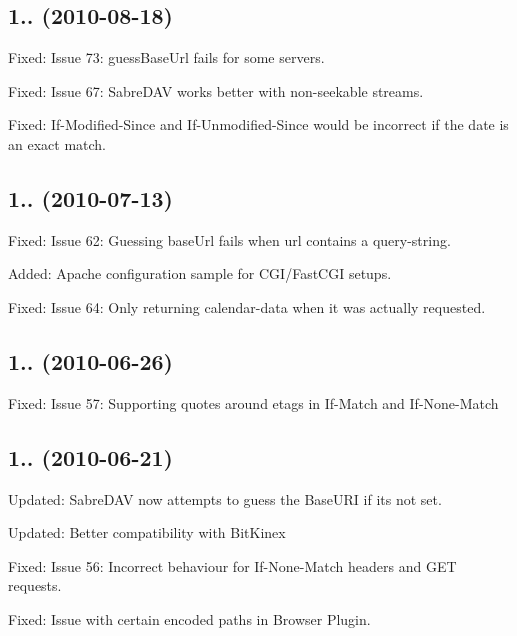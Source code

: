 \subsection*{1.. (2010-\/08-\/18) }


\begin{DoxyItemize}
\item Fixed\+: Issue 73\+: guess\+Base\+Url fails for some servers.
\item Fixed\+: Issue 67\+: Sabre\+D\+AV works better with non-\/seekable streams.
\item Fixed\+: If-\/\+Modified-\/\+Since and If-\/\+Unmodified-\/\+Since would be incorrect if the date is an exact match.
\end{DoxyItemize}

\subsection*{1.. (2010-\/07-\/13) }


\begin{DoxyItemize}
\item Fixed\+: Issue 62\+: Guessing base\+Url fails when url contains a query-\/string.
\item Added\+: Apache configuration sample for C\+G\+I/\+Fast\+C\+GI setups.
\item Fixed\+: Issue 64\+: Only returning calendar-\/data when it was actually requested.
\end{DoxyItemize}

\subsection*{1.. (2010-\/06-\/26) }


\begin{DoxyItemize}
\item Fixed\+: Issue 57\+: Supporting quotes around etags in If-\/\+Match and If-\/\+None-\/\+Match
\end{DoxyItemize}

\subsection*{1.. (2010-\/06-\/21) }


\begin{DoxyItemize}
\item Updated\+: Sabre\+D\+AV now attempts to guess the Base\+U\+RI if it\textquotesingle{}s not set.
\item Updated\+: Better compatibility with Bit\+Kinex
\item Fixed\+: Issue 56\+: Incorrect behaviour for If-\/\+None-\/\+Match headers and G\+ET requests.
\item Fixed\+: Issue with certain encoded paths in Browser Plugin.
\end{DoxyItemize}

